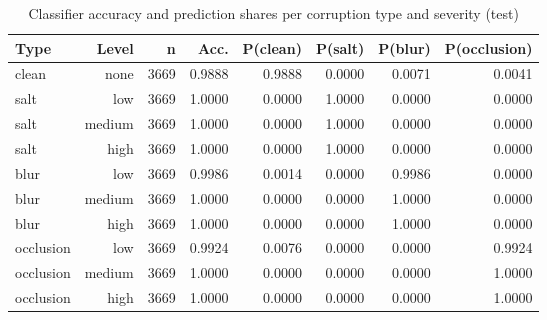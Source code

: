 \begin{table}[t]
\centering
\caption{Classifier accuracy and prediction shares per corruption type and severity (test)}
\label{tab:t2_clf_type_level}
\begin{tabular}{lrrrrrrr}
\toprule
Type & Level & n & Acc. & P(clean) & P(salt) & P(blur) & P(occlusion) \\
\midrule
clean & none & 3669 & 0.9888 & 0.9888 & 0.0000 & 0.0071 & 0.0041 \\
salt & low & 3669 & 1.0000 & 0.0000 & 1.0000 & 0.0000 & 0.0000 \\
salt & medium & 3669 & 1.0000 & 0.0000 & 1.0000 & 0.0000 & 0.0000 \\
salt & high & 3669 & 1.0000 & 0.0000 & 1.0000 & 0.0000 & 0.0000 \\
blur & low & 3669 & 0.9986 & 0.0014 & 0.0000 & 0.9986 & 0.0000 \\
blur & medium & 3669 & 1.0000 & 0.0000 & 0.0000 & 1.0000 & 0.0000 \\
blur & high & 3669 & 1.0000 & 0.0000 & 0.0000 & 1.0000 & 0.0000 \\
occlusion & low & 3669 & 0.9924 & 0.0076 & 0.0000 & 0.0000 & 0.9924 \\
occlusion & medium & 3669 & 1.0000 & 0.0000 & 0.0000 & 0.0000 & 1.0000 \\
occlusion & high & 3669 & 1.0000 & 0.0000 & 0.0000 & 0.0000 & 1.0000 \\
\bottomrule
\end{tabular}
\end{table}
